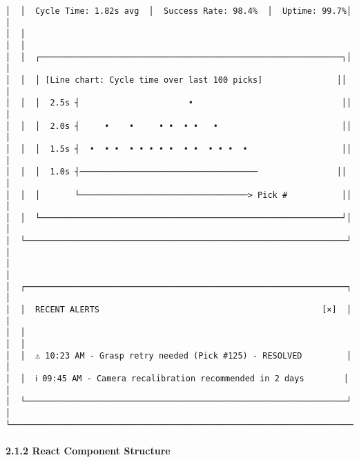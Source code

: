 \documentclass[
]{article}
\begin{document}
\begin{verbatim}
│  │  Cycle Time: 1.82s avg  │  Success Rate: 98.4%  │  Uptime: 99.7%│  │
│  │                                                                  │  │
│  │  ┌─────────────────────────────────────────────────────────────┐│  │
│  │  │ [Line chart: Cycle time over last 100 picks]               ││  │
│  │  │  2.5s ┤                      •                              ││  │
│  │  │  2.0s ┤     •    •     • •  • •   •                         ││  │
│  │  │  1.5s ┤  •  • •  • • • • •  • •  • • •  •                   ││  │
│  │  │  1.0s ┤────────────────────────────────────                ││  │
│  │  │       └──────────────────────────────────> Pick #           ││  │
│  │  └─────────────────────────────────────────────────────────────┘│  │
│  └─────────────────────────────────────────────────────────────────┘  │
│                                                                        │
│  ┌─────────────────────────────────────────────────────────────────┐  │
│  │  RECENT ALERTS                                             [×]  │  │
│  │                                                                  │  │
│  │  ⚠ 10:23 AM - Grasp retry needed (Pick #125) - RESOLVED         │  │
│  │  ℹ 09:45 AM - Camera recalibration recommended in 2 days        │  │
│  └─────────────────────────────────────────────────────────────────┘  │
└────────────────────────────────────────────────────────────────────────┘
\end{verbatim}

\hypertarget{react-component-structure}{%
\paragraph{2.1.2 React Component
Structure}\label{react-component-structure}}
\end{document}
